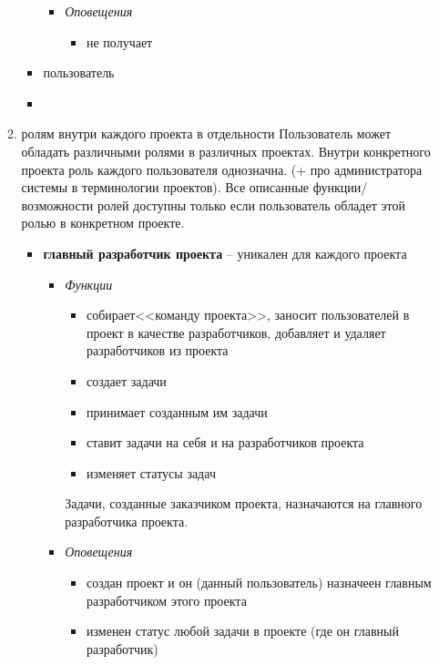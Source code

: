 \documentclass[14pt,a4paper]{extarticle}
\begin{document}
\begin{enumerate}
\begin{enumerate}
\begin{itemize}
\begin{itemize}
					\item {\it Оповещения}
					\begin{itemize}
						\item не получает
					\end{itemize}
				\end{itemize}
				
				\item { пользователь}
				
				\item {}
				
			\end{itemize}
			
			\item { ролям внутри каждого проекта в отдельности}
			Пользователь может обладать различными ролями в различных проектах. Внутри конкретного проекта роль каждого пользователя однозначна. (+ про администратора системы в терминологии проектов). Все описанные функции/возможности ролей доступны только если пользователь обладет этой ролью в конкретном проекте.
			\begin{itemize}
				\item {\bf главный разработчик проекта} -- уникален для каждого проекта
				\begin{itemize}
					\item {\it Функции}
					\begin{itemize}
						\item собирает<<команду проекта>>, заносит пользователей в проект в качестве разработчиков, добавляет и удаляет разработчиков из проекта
						\item создает задачи
						\item принимает созданным им задачи
						\item ставит задачи на себя и на разработчиков проекта
						\item изменяет статусы задач
					\end{itemize}
					Задачи, созданные заказчиком проекта, назначаются на главного разработчика проекта.
					
					\item {\it Оповещения}
					\begin{itemize}
						\item создан проект и он (данный пользователь) назначеен главным разработчиком этого проекта
						
						\item изменен статус любой задачи в проекте (где он главный разработчик)
						

\end{itemize}
\end{itemize}
\end{itemize}
\end{enumerate}
\end{enumerate}
\end{document}
